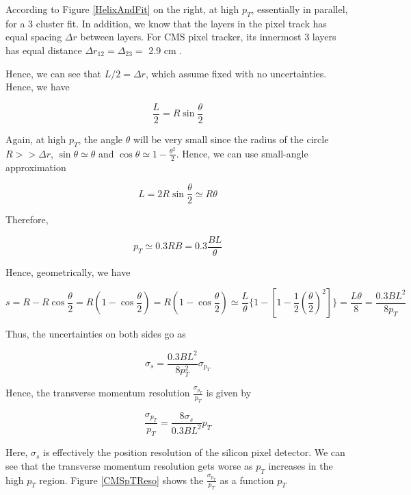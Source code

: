 According to Figure \ref{HelixAndFit} on the right, at high $p_T$, essentially in parallel, for a 3 cluster fit. In addition, we know that the layers in the pixel track has equal spacing $\Delta r$ between layers. For CMS pixel tracker, its innermost 3 layers has equal distance $\Delta r_{12} = \Delta_{23} =$ 2.9 cm \cite{CMSPIXInfo}. 


Hence, we can see that $L/2 = \Delta r$, which assume fixed with no uncertainties. Hence, we have

\begin{equation}
\frac{L}{2} = R \sin \frac{\theta}{2}
\end{equation}

Again, at high $p_T$, the angle $\theta$ will be very small since the radius of the circle $R >> \Delta r$, $\sin\theta \simeq \theta$ and $\cos\theta \simeq 1 - \frac{\theta^2}{2}$. Hence, we can use small-angle approximation

\begin{equation}
L = 2 R \sin \frac{\theta}{2} \simeq R \theta
\end{equation}

Therefore,

\begin{equation}
p_T  \simeq 0.3 RB = 0.3 \frac{BL}{\theta}
\end{equation}


Hence, geometrically, we have


\begin{equation}
s = R - R \cos \frac{\theta}{2} = R (1 -  \cos \frac{\theta}{2}) =  R (1 -  \cos \frac{\theta}{2})  \simeq  \frac{L}{\theta} \{1 - [1 - \frac{1}{2} (\frac{\theta}{2})^2] \} =  \frac{L\theta}{8} = \frac{0.3BL^2}{8p_T}
\end{equation}

Thus, the uncertainties on both sides go as 

\begin{equation}
\sigma_s =  \frac{0.3BL^2}{8p_T^2} \sigma_{p_T}
\end{equation}

Hence, the transverse momentum resolution $\frac{\sigma_{p_T}}{p_T}$ is given by 


\begin{equation}
\frac{\sigma_{p_T}}{p_T} = \frac{8\sigma_s}{0.3BL^2} p_T
\end{equation}

Here, $\sigma_s$ is effectively the position resolution of the silicon pixel detector. We can see that the transverse momentum resolution gets worse as $p_T$ increases in the high $p_T$ region. Figure \ref{CMSpTReso} shows the $\frac{\sigma_{p_T}}{p_T}$ as a function $p_T$


